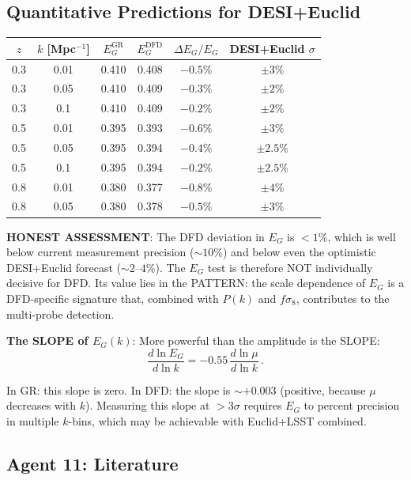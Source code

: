 \documentclass[11pt,a4paper]{article}
\begin{document}
\subsection{Quantitative Predictions for DESI+Euclid}

\begin{center}
\begin{longtable}{cccccc}
\toprule
$z$ & $k$ [Mpc$^{-1}$] & $E_G^{\mathrm{GR}}$ & $E_G^{\mathrm{DFD}}$ & $\Delta E_G/E_G$ & DESI+Euclid $\sigma$ \\
\midrule
0.3 & 0.01 & 0.410 & 0.408 & $-0.5\%$ & $\pm 3\%$ \\
0.3 & 0.05 & 0.410 & 0.409 & $-0.3\%$ & $\pm 2\%$ \\
0.3 & 0.1 & 0.410 & 0.409 & $-0.2\%$ & $\pm 2\%$ \\
0.5 & 0.01 & 0.395 & 0.393 & $-0.6\%$ & $\pm 3\%$ \\
0.5 & 0.05 & 0.395 & 0.394 & $-0.4\%$ & $\pm 2.5\%$ \\
0.5 & 0.1 & 0.395 & 0.394 & $-0.2\%$ & $\pm 2.5\%$ \\
0.8 & 0.01 & 0.380 & 0.377 & $-0.8\%$ & $\pm 4\%$ \\
0.8 & 0.05 & 0.380 & 0.378 & $-0.5\%$ & $\pm 3\%$ \\
\bottomrule
\end{longtable}
\end{center}

\textbf{HONEST ASSESSMENT}: The DFD deviation in $E_G$ is $< 1\%$, which is well below current measurement precision ($\sim 10\%$) and below even the optimistic DESI+Euclid forecast ($\sim 2$--$4\%$). The $E_G$ test is therefore NOT individually decisive for DFD. Its value lies in the PATTERN: the scale dependence of $E_G$ is a DFD-specific signature that, combined with $P(k)$ and $f\sigma_8$, contributes to the multi-probe detection.

\textbf{The SLOPE of $E_G(k)$}: More powerful than the amplitude is the SLOPE:
\begin{equation}
\frac{d\ln E_G}{d\ln k} = -0.55\,\frac{d\ln\mu}{d\ln k}\,.
\end{equation}

In GR: this slope is zero. In DFD: the slope is $\sim +0.003$ (positive, because $\mu$ decreases with $k$). Measuring this slope at $> 3\sigma$ requires $E_G$ to percent precision in multiple $k$-bins, which may be achievable with Euclid+LSST combined.

\subsection{Agent 11: Literature}
\end{document}
